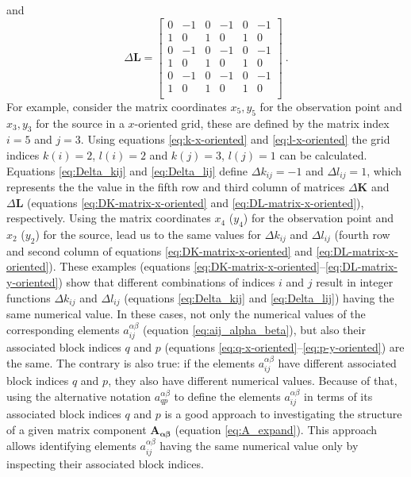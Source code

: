 \documentclass[manuscript]{geophysics}
\begin{document}
and
\begin{equation}
	\Delta\mathbf{L} = \begin{bmatrix}
		0 &  -1 &   0 &  -1 &   0 &  -1 \\
		1 &   0 &   1 &   0 &   1 &   0 \\
		0 &  -1 &   0 &  -1 &   0 &  -1 \\
		1 &   0 &   1 &   0 &   1 &   0 \\
		0 &  -1 &   0 &  -1 &   0 &  -1 \\
		1 &   0 &   1 &   0 &   1 &   0 \\
	\end{bmatrix} \: .
	\label{eq:DL-matrix-y-oriented}
\end{equation}
For example, consider the matrix coordinates $x_{5}, y_{5}$ for the observation point and $x_{3}, y_{3}$ for the source in a $x$-oriented grid, these are defined by the matrix index $i = 5$ and $j = 3$.
Using equations \ref{eq:k-x-oriented} and \ref{eq:l-x-oriented} the grid indices $k(i) = 2$, $l(i) = 2$ and $k(j) = 3$, $l(j) = 1$ can be calculated. Equations \ref{eq:Delta_kij} and \ref{eq:Delta_lij} define $\Delta k_{ij} = -1$ and $\Delta l_{ij} = 1$, which represents the the value in the fifth row and third column of matrices $\Delta\mathbf{K}$ and $\Delta\mathbf{L}$ (equations \ref{eq:DK-matrix-x-oriented} and \ref{eq:DL-matrix-x-oriented}), respectively. Using the matrix coordinates $x_{4}$ ($y_{4}$) for the observation point and $x_{2}$ ($y_{2}$) for the source, lead us to the same values for $\Delta k_{ij}$ and $\Delta l_{ij}$ (fourth row and second column of equations \ref{eq:DK-matrix-x-oriented} and \ref{eq:DL-matrix-x-oriented}).
These examples (equations \ref{eq:DK-matrix-x-oriented}--\ref{eq:DL-matrix-y-oriented})
show that different combinations of indices $i$ and $j$ result in integer functions 
$\Delta k_{ij}$ and $\Delta l_{ij}$ (equations \ref{eq:Delta_kij} and \ref{eq:Delta_lij}) 
having the same numerical value. In these cases, not only the numerical values of
the corresponding elements $a^{\alpha\beta}_{ij}$ (equation \ref{eq:aij_alpha_beta}),
but also their associated block indices $q$ and $p$ (equations 
\ref{eq:q-x-oriented}--\ref{eq:p-y-oriented}) are the same.
The contrary is also true: if the elements $a^{\alpha\beta}_{ij}$ have different 
associated block indices $q$ and $p$, they also have different numerical values.
Because of that, using the alternative notation $a^{\alpha\beta}_{qp}$ to define the elements 
$a^{\alpha\beta}_{ij}$ in terms of its associated block indices $q$ and $p$ is a good
approach to investigating the structure of a given matrix component 
$\mathbf{A_{\boldsymbol{\alpha\beta}}}$ (equation \ref{eq:A_expand}).
This approach allows identifying elements $a^{\alpha\beta}_{ij}$ having the same numerical
value only by inspecting their associated block indices.
\end{document}
